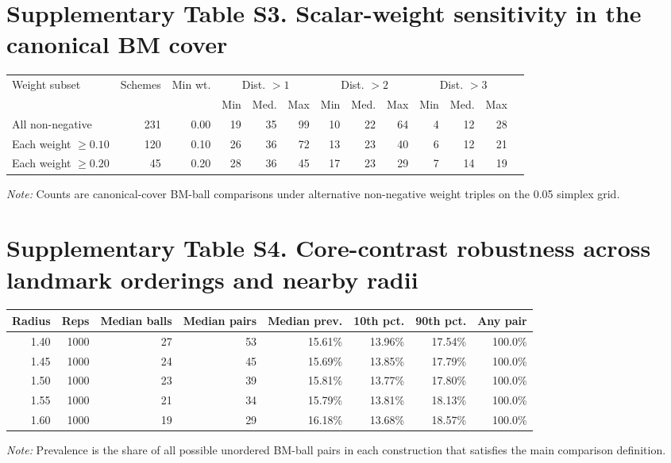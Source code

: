 \documentclass[10pt,a4paper]{article}
\begin{document}
\section*{Supplementary Table S3. Scalar-weight sensitivity in the canonical BM cover}
\begin{center}\scriptsize
\begin{tabular}{lrrrrrrrrrrrr}
\toprule
Weight subset & Schemes & Min wt. & \multicolumn{3}{c}{Dist. $>1$} & \multicolumn{3}{c}{Dist. $>2$} & \multicolumn{3}{c}{Dist. $>3$}\\
\cmidrule(lr){4-6}\cmidrule(lr){7-9}\cmidrule(lr){10-12}
 & & & Min & Med. & Max & Min & Med. & Max & Min & Med. & Max\\
\midrule
All non-negative & 231 & 0.00 & 19 & 35 & 99 & 10 & 22 & 64 & 4 & 12 & 28 \\
Each weight $\geq0.10$ & 120 & 0.10 & 26 & 36 & 72 & 13 & 23 & 40 & 6 & 12 & 21 \\
Each weight $\geq0.20$ & 45 & 0.20 & 28 & 36 & 45 & 17 & 23 & 29 & 7 & 14 & 19 \\
\bottomrule
\end{tabular}
\end{center}
\textit{Note:} Counts are canonical-cover BM-ball comparisons under alternative non-negative weight triples on the 0.05 simplex grid.
\section*{Supplementary Table S4. Core-contrast robustness across landmark orderings and nearby radii}
\begin{center}\small
\begin{tabular}{rrrrrrrr}
\toprule
Radius & Reps & Median balls & Median pairs & Median prev. & 10th pct. & 90th pct. & Any pair\\
\midrule
1.40 & 1000 & 27 & 53 & 15.61\% & 13.96\% & 17.54\% & 100.0\% \\
1.45 & 1000 & 24 & 45 & 15.69\% & 13.85\% & 17.79\% & 100.0\% \\
1.50 & 1000 & 23 & 39 & 15.81\% & 13.77\% & 17.80\% & 100.0\% \\
1.55 & 1000 & 21 & 34 & 15.79\% & 13.81\% & 18.13\% & 100.0\% \\
1.60 & 1000 & 19 & 29 & 16.18\% & 13.68\% & 18.57\% & 100.0\% \\
\bottomrule
\end{tabular}
\end{center}
\textit{Note:} Prevalence is the share of all possible unordered BM-ball pairs in each construction that satisfies the main comparison definition.
\end{document}
